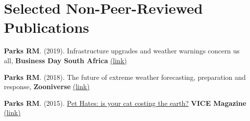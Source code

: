 \section*{Selected Non-Peer-Reviewed Publications}


\noindent \textbf{Parks RM}. (2019). Infrastructure upgrades and weather warnings concern us all, \textbf{Business Day South Africa} \href{https://bit.ly/2pyB4Gc}{(link)} \medskip


\noindent \textbf{Parks RM}. (2018). The future of extreme weather forecasting, preparation and response, \textbf{Zooniverse} \href{https://bit.ly/2zfDlHw}{(link)} \medskip


\noindent \textbf{Parks RM}. (2015). \href{https://bit.ly/2FE08nX}{Pet Hates: is your cat costing the earth?} \textbf{VICE Magazine} \href{https://bit.ly/2FE08nX}{(link)}

